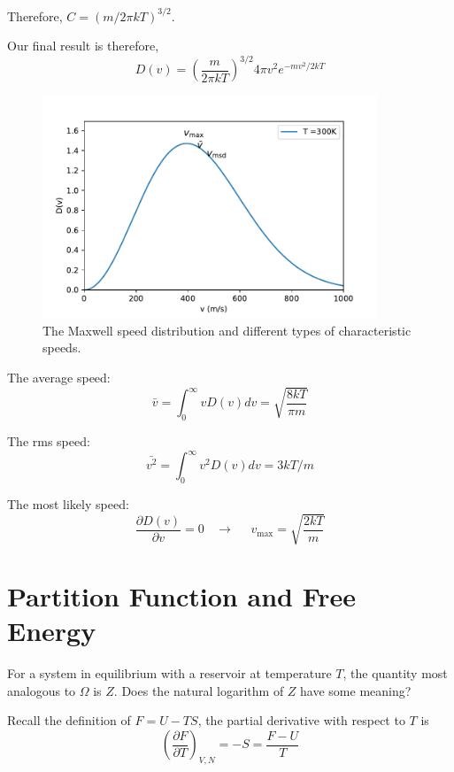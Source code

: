 Therefore, $C=(m/2\pi kT)^{3/2}$.

Our final result is therefore,
\begin{equation}
D(v) = (\frac{m}{2\pi kT})^{3/2}4\pi v^2 e^{-mv^2/2kT}
\end{equation}

\begin{figure}[h]
\centering
\includegraphics[width=10cm]{imgs/Maxwell-speed.pdf}
\caption{The Maxwell speed distribution and different types of characteristic speeds. }
\end{figure}




The average speed:
\begin{equation}
\bar{v} = \int _0 ^{\infty} vD(v) dv = \sqrt{\frac{8kT}{\pi m}}
\end{equation}

The rms speed:
\begin{equation}
\bar{v^2} = \int_0^{\infty} v^2D(v) dv = 3kT/m
\end{equation}

The most likely speed:
\begin{equation}
\frac{\partial D(v)}{\partial v} = 0 ~~~~\rightarrow~~~~~~ v_\text{max}= \sqrt{\frac{2kT}{m}}
\end{equation}


\section{Partition Function and Free Energy}
For a system in equilibrium with a reservoir at temperature $T$, the quantity most analogous to $\Omega$ is $Z$. Does the natural logarithm of $Z$ have some meaning?

Recall the definition of $F = U - TS$, the partial derivative with respect to $T$ is
\begin{equation}
(\frac{\partial F}{\partial{T}})_{V,N} = -S = \frac{F-U}{T}
\end{equation}

